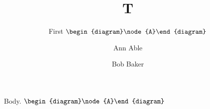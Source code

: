 \documentclass{article}
\begin{document}
\title{T}
\author{First $\begin{diagram}\node{A}\end{diagram}$}
\author{Ann Able \and Bob Baker}
\maketitle
Body. $\begin{diagram}\node{A}\end{diagram}$
\end{document}
